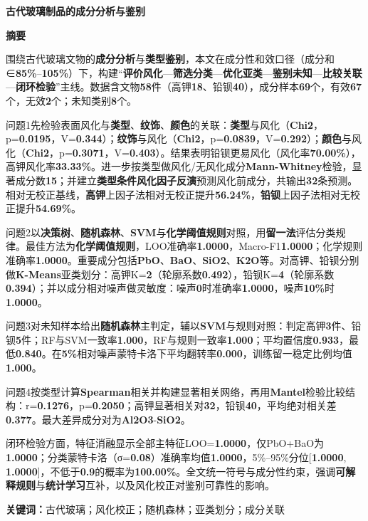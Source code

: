 \documentclass[UTF8,a4paper,12pt]{ctexart}
\begin{document}
\thispagestyle{plain}
\setcounter{page}{1}
\begin{center}
{\Large\bfseries 古代玻璃制品的成分分析与鉴别}
\end{center}
\vspace{0.4em}
\begin{center}
{\large\bfseries 摘要}
\end{center}
\vspace{0.2em}
{\small
\setlength{\parindent}{2em}
围绕古代玻璃文物的\textbf{成分分析}与\textbf{类型鉴别}，本文在成分性和效口径（成分和∈\textbf{85\%}–\textbf{105\%}）下，构建“\textbf{评价风化}—\textbf{筛选分类}—\textbf{优化亚类}—\textbf{鉴别未知}—\textbf{比较关联}—\textbf{闭环检验}”主线。数据含文物\textbf{58}件（高钾\textbf{18}、铅钡\textbf{40}），成分样本\textbf{69}个，有效\textbf{67}个，无效\textbf{2}个；未知类别\textbf{8}个。

问题1先检验表面风化与\textbf{类型}、\textbf{纹饰}、\textbf{颜色}的关联：\textbf{类型}与风化（\textbf{Chi2}，p=\textbf{0.0195}，V=\textbf{0.344}）；\textbf{纹饰}与风化（\textbf{Chi2}，p=\textbf{0.0839}，V=\textbf{0.292}）；\textbf{颜色}与风化（\textbf{Chi2}，p=\textbf{0.3071}，V=\textbf{0.403}）。结果表明铅钡更易风化（风化率\textbf{70.00\%}），高钾风化率\textbf{33.33\%}。进一步按类型做风化/无风化成分\textbf{Mann-Whitney}检验，显著成分数\textbf{15}；并建立\textbf{类型条件风化因子反演}预测风化前成分，共输出\textbf{32}条预测。相对无校正基线，\textbf{高钾}上因子法相对无校正提升\textbf{56.24\%}，\textbf{铅钡}上因子法相对无校正提升\textbf{54.69\%}。

问题2以\textbf{决策树}、\textbf{随机森林}、\textbf{SVM}与\textbf{化学阈值规则}对照，用\textbf{留一法}评估分类规律。最佳方法为\textbf{化学阈值规则}，LOO准确率\textbf{1.0000}，Macro-F1\textbf{1.0000}；化学规则准确率\textbf{1.0000}。重要成分包括\textbf{PbO}、\textbf{BaO}、\textbf{SiO2}、\textbf{K2O}等。对高钾、铅钡分别做\textbf{K-Means}亚类划分：高钾K=\textbf{2}（轮廓系数\textbf{0.492}），铅钡K=\textbf{4}（轮廓系数\textbf{0.394}）；并以成分相对噪声做灵敏度：噪声\textbf{0}时准确率\textbf{1.0000}，噪声\textbf{10\%}时\textbf{1.0000}。

问题3对未知样本给出\textbf{随机森林}主判定，辅以\textbf{SVM}与规则对照：判定高钾\textbf{3}件、铅钡\textbf{5}件；RF与SVM一致率\textbf{1.000}，RF与规则一致率\textbf{1.000}；平均置信度\textbf{0.933}，最低\textbf{0.840}。在\textbf{5\%}相对噪声蒙特卡洛下平均翻转率\textbf{0.000}，训练留一稳定比例均值\textbf{1.000}。

问题4按类型计算\textbf{Spearman}相关并构建显著相关网络，再用\textbf{Mantel}检验比较结构：r=\textbf{0.1276}，p=\textbf{0.2050}；高钾显著相关对\textbf{32}，铅钡\textbf{40}，平均绝对相关差\textbf{0.377}。最大差异成分对为\textbf{Al2O3}-\textbf{SiO2}。

闭环检验方面，特征消融显示全部主特征LOO=\textbf{1.0000}，仅PbO+BaO为\textbf{1.0000}；分类蒙特卡洛（σ=\textbf{0.08}）准确率均值\textbf{1.0000}，5\%–95\%分位[\textbf{1.0000}, \textbf{1.0000}]，不低于\textbf{0.9}的概率为\textbf{100.00\%}。全文统一符号与成分性约束，强调\textbf{可解释规则}与\textbf{统计学习}互补，以及风化校正对鉴别可靠性的影响。

\vspace{0.5em}
\noindent\textbf{关键词：}古代玻璃；风化校正；随机森林；亚类划分；成分关联
}
\end{document}
